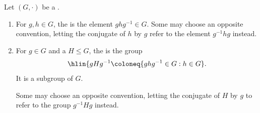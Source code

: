 \begin{definition}[Conjugation] \label{definition:conjugation_of_group_elements_and_subgroup_by_a_group_element}
Let $(G,\cdot)$ be a . 
\begin{enumerate}
    \item For $g,h \in G$, the  is the element $g h g^{-1} \in G$.
    Some may choose an opposite convention, letting the conjugate of $h$ by $g$ refer to the element $g^{-1} h g$ instead.

    \item For $g \in G$ and a  $H \leq G$, the  is the group 
    $$\hlin{gHg^{-1} \coloneq \{ghg^{-1} \in G: h \in G}.$$
    It is a subgroup of $G$.

    Some may choose an opposite convention, letting the conjugate of $H$ by $g$ to refer to the group $g^{-1} H g$ instead.
\end{enumerate}
\end{definition}
